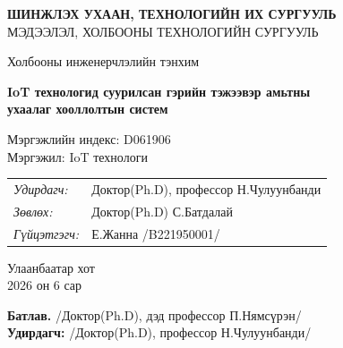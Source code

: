 \documentclass[12pt,a4paper]{report}
\begin{document}
\newpage
\begin{titlepage}
  \begin{center}
    \onehalfspacing
    {\large\textbf{ШИНЖЛЭХ УХААН, ТЕХНОЛОГИЙН ИХ СУРГУУЛЬ}}\\[4pt]
    {\large МЭДЭЭЛЭЛ, ХОЛБООНЫ ТЕХНОЛОГИЙН СУРГУУЛЬ}\\[1cm]
    \begin{flushright}Холбооны инженерчлэлийн тэнхим\end{flushright}
    \vspace{2.5cm}
    {\Large\textbf{IoT технологид суурилсан гэрийн тэжээвэр амьтны\\[4pt]
    ухаалаг хооллолтын систем}}
    \vspace{2.5cm}
    \begin{flushleft}
      \hspace{2cm} Мэргэжлийн индекс: D061906\\[4pt]
      \hspace{2cm} Мэргэжил: IoT технологи
    \end{flushleft}
    \vspace{2cm}
    \begin{flushright}
      \begin{tabular}{ll}
        \textit{Удирдагч:}   & Доктор(Ph.D), профессор Н.Чулуунбанди \\[4pt]
        \textit{Зөвлөх:}     &Доктор(Ph.D) С.Батдалай \\[4pt]
        \textit{Гүйцэтгэгч:} & Е.Жанна /B221950001/
      \end{tabular}
    \end{flushright}
    \vfill
    {\large Улаанбаатар хот\\2026 он 6 сар}
  \end{center}
\end{titlepage}

\newpage
\thispagestyle{plain}
\begin{flushright}
  \begin{minipage}{0.72\textwidth}
    \small
    \textbf{Батлав.} \dotfill /Доктор(Ph.D), дэд профессор П.Нямсүрэн/\\[6pt]
    \textbf{Удирдагч:} \dotfill /Доктор(Ph.D), профессор Н.Чулуунбанди/
  \end{minipage}
\end{flushright}
\vspace{0.5cm}
\end{document}
